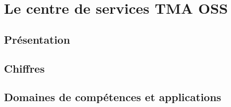\chapter{Le centre de services TMA OSS}
\section{Présentation}
\section{Chiffres}
\section{Domaines de compétences et applications}
